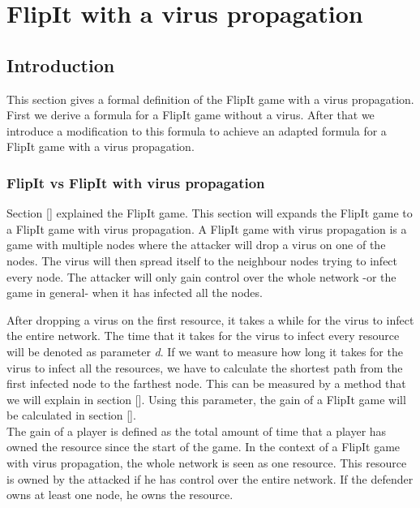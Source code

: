 \chapter{FlipIt with a virus propagation }
\label{cha:6}


\section{Introduction}
This section gives a formal definition of the FlipIt game with a virus propagation. First we derive a formula for a FlipIt game without a virus. After that we introduce a modification to this formula to achieve an adapted formula for a FlipIt game with a virus propagation. 

\subsection{FlipIt vs FlipIt with virus propagation}
Section [] explained the FlipIt game. This section will expands the FlipIt game to a FlipIt game with virus propagation. A FlipIt game with virus propagation is a game with multiple nodes where the attacker will drop a virus on one of the nodes. The virus will then spread itself to the neighbour nodes trying to infect every node. The attacker will only gain control over the whole network -or the game in general- when it has infected all the nodes. 

After dropping a virus on the first resource, it takes a while for the virus to infect the entire network. The time that it takes for the virus to infect every resource will be denoted as parameter \textit{d}. If we want to measure how long it takes for the virus to infect all the resources, we have to calculate the shortest path from the first infected node to the farthest node. This can be measured by a method that we will explain in section []. Using this parameter, the gain of a FlipIt game will be calculated in section []. \\ 
The gain of a player is defined as the total amount of time that a player has owned the resource since the start of the game. In the context of a FlipIt game with virus propagation, the whole network is seen as one resource. This resource is owned by the attacked if he has control over the entire network. If the defender owns at least one node, he owns the resource.\\

